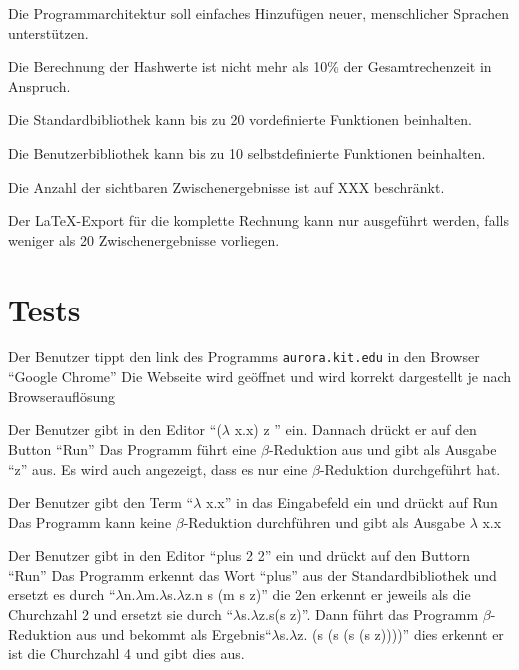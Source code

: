 \documentclass[parskip=full,11pt,twoside]{scrartcl}
\begin{document}
Die Programmarchitektur soll einfaches Hinzufügen neuer, menschlicher Sprachen unterstützen.

Die Berechnung der Hashwerte ist nicht mehr als 10\% der Gesamtrechenzeit in Anspruch.

Die Standardbibliothek kann bis zu 20 vordefinierte Funktionen beinhalten.

Die Benutzerbibliothek kann bis zu 10 selbstdefinierte Funktionen beinhalten.

Die Anzahl der sichtbaren Zwischenergebnisse ist auf XXX beschränkt.

Der LaTeX-Export für die komplette Rechnung kann nur ausgeführt werden, falls weniger als 20 Zwischenergebnisse vorliegen.



\section{Tests}


{Der Benutzer tippt den link des Programms \texttt{aurora.kit.edu} in den Browser \enquote {Google Chrome} }
{ Die Webseite wird geöffnet und wird korrekt dargestellt je nach Browserauflösung}

{ Der Benutzer gibt in den Editor \enquote {($\lambda$ x.x) z } ein. Dannach drückt er auf den Button \enquote {Run}}
{ Das Programm führt eine $\beta$-Reduktion aus und gibt als Ausgabe \enquote {z} aus. Es wird auch angezeigt, dass es nur eine $\beta$-Reduktion durchgeführt hat.}

{Der Benutzer gibt den Term \enquote {$\lambda$ x.x} in das Eingabefeld ein und drückt auf Run}
{Das Programm kann keine $\beta$-Reduktion durchführen und gibt als Ausgabe $\lambda$ x.x}

{Der Benutzer gibt in den Editor \enquote {plus 2 2} ein und drückt auf den Buttorn \enquote {Run}}
{ Das Programm erkennt das Wort \enquote {plus} aus der Standardbibliothek und ersetzt es durch \enquote {$\lambda$n.$\lambda$m.$\lambda$s.$\lambda$z.n s (m s z)} die 2en erkennt er jeweils als die Churchzahl 2 und ersetzt sie durch \enquote {$\lambda$s.$\lambda$z.s(s z)}. Dann führt das Programm $\beta$-Reduktion aus und bekommt als Ergebnis\enquote {$\lambda$s.$\lambda$z. (s (s (s (s z))))} dies erkennt er ist die Churchzahl 4 und gibt dies aus. }
\end{document}
